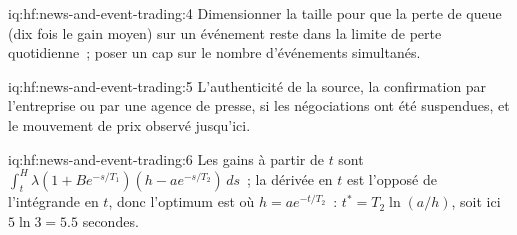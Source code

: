 \begin{solution}{iq:hf:news-and-event-trading:4}
Dimensionner la taille pour que la perte de queue (dix fois le gain moyen) sur un événement reste dans la limite de perte quotidienne~; poser un cap sur le nombre d'événements simultanés.
\end{solution}

\begin{solution}{iq:hf:news-and-event-trading:5}
L'authenticité de la source, la confirmation par l'entreprise ou par une agence de presse, si les négociations ont été suspendues, et le mouvement de prix observé jusqu'ici.
\end{solution}

\begin{solution}{iq:hf:news-and-event-trading:6}
Les gains à partir de $t$ sont $\int_t^H\lambda(1+Be^{-s/T_1})(h-a e^{-s/T_2})\,ds$~; la dérivée en $t$ est l'opposé de l'intégrande en $t$, donc l'optimum est
où $h=a e^{-t/T_2}$~: $t^\ast=T_2\ln(a/h)$, soit ici $5\ln3=5.5$ secondes.
\end{solution}
